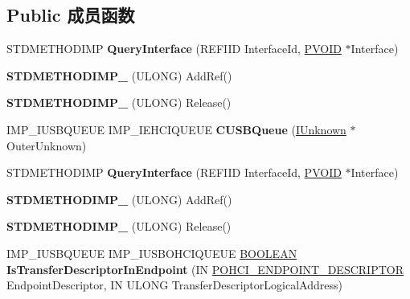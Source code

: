 \subsection*{Public 成员函数}
\begin{DoxyCompactItemize}
\item 
\mbox{\label{class_c_u_s_b_queue_a84151b9419ed4c3af460701e69c541c6}} 
S\+T\+D\+M\+E\+T\+H\+O\+D\+I\+MP {\bfseries Query\+Interface} (R\+E\+F\+I\+ID Interface\+Id, \hyperlink{interfacevoid}{P\+V\+O\+ID} $\ast$Interface)
\item 
\mbox{\label{class_c_u_s_b_queue_abda1e16a6620fb1e76e2154ecdaae358}} 
{\bfseries S\+T\+D\+M\+E\+T\+H\+O\+D\+I\+M\+P\+\_\+} (U\+L\+O\+NG) Add\+Ref()
\item 
\mbox{\label{class_c_u_s_b_queue_a36bec2580946a080066f59ff48ac67cb}} 
{\bfseries S\+T\+D\+M\+E\+T\+H\+O\+D\+I\+M\+P\+\_\+} (U\+L\+O\+NG) Release()
\item 
\mbox{\label{class_c_u_s_b_queue_a27212c900db0c6be73e3be094bb7bd1a}} 
I\+M\+P\+\_\+\+I\+U\+S\+B\+Q\+U\+E\+UE I\+M\+P\+\_\+\+I\+E\+H\+C\+I\+Q\+U\+E\+UE {\bfseries C\+U\+S\+B\+Queue} (\hyperlink{interface_i_unknown}{I\+Unknown} $\ast$Outer\+Unknown)
\item 
\mbox{\label{class_c_u_s_b_queue_a84151b9419ed4c3af460701e69c541c6}} 
S\+T\+D\+M\+E\+T\+H\+O\+D\+I\+MP {\bfseries Query\+Interface} (R\+E\+F\+I\+ID Interface\+Id, \hyperlink{interfacevoid}{P\+V\+O\+ID} $\ast$Interface)
\item 
\mbox{\label{class_c_u_s_b_queue_abda1e16a6620fb1e76e2154ecdaae358}} 
{\bfseries S\+T\+D\+M\+E\+T\+H\+O\+D\+I\+M\+P\+\_\+} (U\+L\+O\+NG) Add\+Ref()
\item 
\mbox{\label{class_c_u_s_b_queue_a36bec2580946a080066f59ff48ac67cb}} 
{\bfseries S\+T\+D\+M\+E\+T\+H\+O\+D\+I\+M\+P\+\_\+} (U\+L\+O\+NG) Release()
\item 
\mbox{\label{class_c_u_s_b_queue_ac722fb274d24509d09a832a9377482c5}} 
I\+M\+P\+\_\+\+I\+U\+S\+B\+Q\+U\+E\+UE I\+M\+P\+\_\+\+I\+U\+S\+B\+O\+H\+C\+I\+Q\+U\+E\+UE \hyperlink{_processor_bind_8h_a112e3146cb38b6ee95e64d85842e380a}{B\+O\+O\+L\+E\+AN} {\bfseries Is\+Transfer\+Descriptor\+In\+Endpoint} (IN \hyperlink{struct___o_h_c_i___e_n_d_p_o_i_n_t___d_e_s_c_r_i_p_t_o_r}{P\+O\+H\+C\+I\+\_\+\+E\+N\+D\+P\+O\+I\+N\+T\+\_\+\+D\+E\+S\+C\+R\+I\+P\+T\+OR} Endpoint\+Descriptor, IN U\+L\+O\+NG Transfer\+Descriptor\+Logical\+Address)

\end{DoxyCompactItemize}
